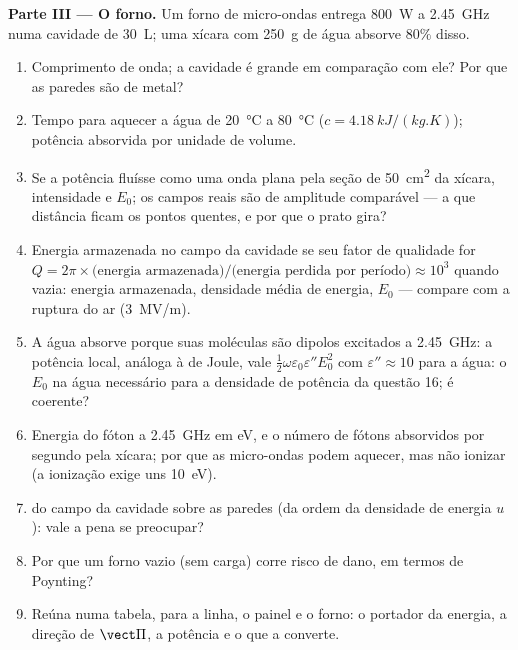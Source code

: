 \begin{problem}
\medskip
\noindent\textbf{Parte III --- O forno.}
Um forno de micro-ondas entrega \qty{800}{W} a \qty{2.45}{GHz} numa cavidade de
\qty{30}{L}; uma xícara com \qty{250}{g} de água absorve $80\%$ disso.
\begin{enumerate}[resume]
  \item Comprimento de onda; a cavidade é grande em comparação com ele? Por que as
        paredes são de metal?
  \item Tempo para aquecer a água de \qty{20}{\degreeCelsius} a \qty{80}{\degreeCelsius}
        ($c = \qty{4.18}{kJ/(kg.K)}$); potência absorvida por unidade de volume.
  \item Se a potência fluísse como uma onda plana pela seção de
        \qty{50}{cm^2} da xícara, intensidade e $E_0$; os campos reais são
         de amplitude comparável --- a que distância ficam
        os pontos quentes, e por que o prato gira?
  \item Energia armazenada no campo da cavidade se seu fator de qualidade for
        $Q = 2\pi\times\text{(energia armazenada)}/\text{(energia perdida por período)}
        \approx 10^3$ quando vazia: energia armazenada, densidade média de energia, $E_0$
        --- compare com a ruptura do ar (\qty{3}{MV/m}).
  \item A água absorve porque suas moléculas são dipolos excitados a
        \qty{2.45}{GHz}: a potência local, análoga à de Joule, vale $\tfrac12\omega\varepsilon_0
        \varepsilon''E_0^2$ com $\varepsilon'' \approx 10$ para a água: o $E_0$ na água
        necessário para a densidade de potência da questão 16; é coerente?
  \item Energia do fóton a \qty{2.45}{GHz} em eV, e o número de fótons
        absorvidos por segundo pela xícara; por que as micro-ondas podem aquecer, mas
        não ionizar (a ionização exige uns \qty{10}{eV}).
  \item {} do campo da cavidade sobre as paredes (da
        ordem da densidade de energia $u$): vale a pena se preocupar?
  \item Por que um forno vazio (sem carga) corre risco de dano, em termos de
        Poynting?
  \item Reúna numa tabela, para a linha, o painel e o forno: o
        portador da energia, a direção de $\vect\Pi$, a potência e o que
        a converte.
\end{enumerate}
\end{problem}
